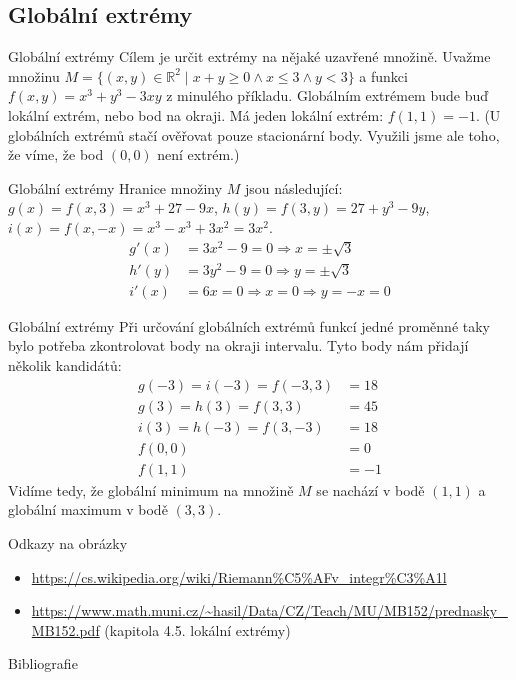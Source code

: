 \documentclass{beamer}
\theoremstyle{definition}
\theoremstyle{example}
\def\R{\mathbb{R}}
\begin{document}
\subsection{Globální extrémy}
\begin{frame}{Globální extrémy}
	Cílem je určit extrémy na nějaké uzavřené množině. Uvažme množinu $M = \{(x, y) \in \R^2 \mid x + y \geq 0 \wedge x \leq 3 \wedge y < 3\}$ a funkci $f(x, y) = x^3 + y^3 - 3xy$ z minulého příkladu. Globálním extrémem bude buď lokální extrém, nebo bod na okraji. Má jeden lokální extrém: $f(1, 1) = -1$. (U globálních extrémů stačí ověřovat pouze stacionární body. Využili jsme ale toho, že víme, že bod $(0, 0)$ není extrém.)
\end{frame}
\begin{frame}{Globální extrémy}
	Hranice množiny $M$ jsou následující: $g(x) = f(x, 3) = x^3 + 27 - 9x$, $h(y) = f(3, y) =  27 + y^3 - 9y$, $i(x) = f(x, -x) = x^3 - x^3 + 3x^2 = 3x^2$.
	\begin{align*}
		g'(x) &= 3x^2 - 9 = 0 \Rightarrow x = \pm \sqrt{3}\\
		h'(y) &= 3y^2 - 9 = 0 \Rightarrow y = \pm \sqrt{3}\\
		i'(x) &= 6x = 0 \Rightarrow x = 0 \Rightarrow y = -x = 0
	\end{align*}
\end{frame}

\begin{frame}{Globální extrémy}
	Při určování globálních extrémů funkcí jedné proměnné taky bylo potřeba zkontrolovat body na okraji intervalu. Tyto body nám přidají několik kandidátů:
	\begin{align*}
		g(-3) = i(-3) = f(-3, 3) &= 18\\
		g(3) = h(3) = f(3, 3) &= 45\\
		i(3) = h(-3) = f(3, -3) &= 18\\
		f(0, 0) &= 0\\
		f(1, 1) &= -1
	\end{align*}
	Vidíme tedy, že globální minimum na množině $M$ se nachází v bodě $(1, 1)$ a globální maximum v bodě $(3, 3)$.
\end{frame}

\begin{frame}{Odkazy na obrázky}
	\begin{itemize}
		\item \url{https://cs.wikipedia.org/wiki/Riemann\%C5\%AFv\_integr\%C3\%A1l}
		\item \url{https://www.math.muni.cz/\~hasil/Data/CZ/Teach/MU/MB152/prednasky\_MB152.pdf} (kapitola 4.5. lokální extrémy)
	\end{itemize}
\end{frame}

\begin{frame}{Bibliografie}
	\printbibliography
\end{frame}
\end{document}
